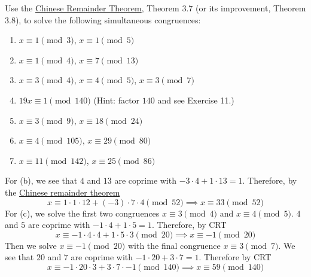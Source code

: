   \begin{exercise}[Shifrin 1.3.21]
    Use the \hyperref[thm:chinese-remainder-theorem]{Chinese Remainder Theorem}, Theorem 3.7 (or its improvement, Theorem 3.8), to solve the following simultaneous congruences:
    \begin{enumerate}[label=\alph*.]
      \item $x \equiv 1 \pmod{3}$, $x \equiv 1 \pmod{5}$
      \item $x \equiv 1 \pmod{4}$, $x \equiv 7 \pmod{13}$
      \item $x \equiv 3 \pmod{4}$, $x \equiv 4 \pmod{5}$, $x \equiv 3 \pmod{7}$
      \item $19x \equiv 1 \pmod{140}$ (Hint: factor $140$ and see Exercise 11.)
      \item $x \equiv 3 \pmod{9}$, $x \equiv 18 \pmod{24}$
      \item $x \equiv 4 \pmod{105}$, $x \equiv 29 \pmod{80}$
      \item $x \equiv 11 \pmod{142}$, $x \equiv 25 \pmod{86}$
    \end{enumerate}
  \end{exercise}
  \begin{solution}
    For (b), we see that $4$ and $13$ are coprime with $-3 \cdot 4 + 1 \cdot 13 = 1$. Therefore, by the \hyperref[thm:chinese-remainder-theorem]{Chinese remainder theorem} 
    \begin{equation}
      x \equiv 1 \cdot 1 \cdot 12 + (-3) \cdot 7 \cdot 4 \pmod{52} \implies x \equiv 33 \pmod{52}
    \end{equation}
    For (c), we solve the first two congruences $x \equiv 3 \pmod{4}$ and $x \equiv 4 \pmod{5}$. $4$ and $5$ are coprime with $-1 \cdot 4 + 1 \cdot 5 = 1$. Therefore, by CRT 
    \begin{equation}
      x \equiv -1 \cdot 4 \cdot 4 + 1 \cdot 5 \cdot 3 \pmod{20} \implies x \equiv -1 \pmod{20}
    \end{equation}
    Then we solve $x \equiv -1 \pmod{20}$ with the final congruence $x \equiv 3 \pmod{7}$. We see that $20$ and $7$ are coprime with $-1 \cdot 20 + 3 \cdot 7 = 1$. Therefore by CRT 
    \begin{equation}
      x \equiv -1 \cdot 20 \cdot 3 + 3 \cdot 7 \cdot -1 \pmod{140} \implies x \equiv 59 \pmod{140}
    \end{equation}
  \end{solution}
  
